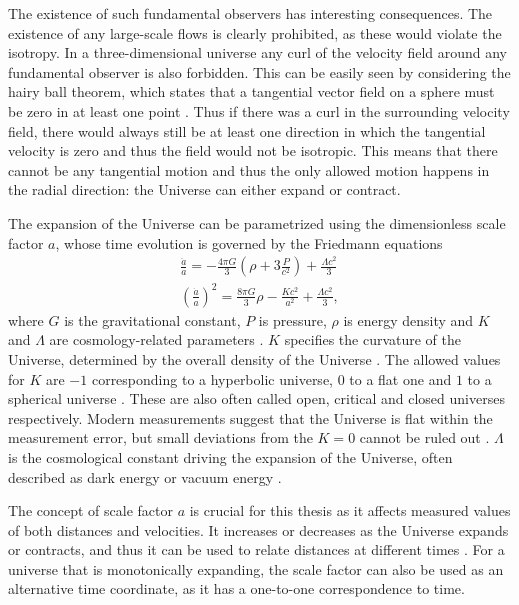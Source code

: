 \documentclass[english, twoside]{HYgradu}
\begin{document}
The existence of such fundamental observers has interesting consequences. The existence of any large-scale flows is clearly prohibited, as these would violate the isotropy. In a three-dimensional universe any curl of the velocity field around any fundamental observer is also forbidden. This can be easily seen by considering the hairy ball theorem, which states that a tangential vector field on a sphere must be zero in at least one point \citep{renteln2013manifolds}. Thus if there was a curl in the surrounding velocity field, there would always still be at least one direction in which the tangential velocity is zero and thus the field would not be isotropic. This means that there cannot be any tangential motion and thus the only allowed motion happens in the radial direction: the Universe can either expand or contract.

The expansion of the Universe can be parametrized using the dimensionless scale factor $a$, whose time evolution is governed by the Friedmann equations
\begin{align}\label{friedmann1}
\frac{\ddot{a}}{a} = -\frac{4\pi G}{3} \left( \rho + 3 \frac{P}{c^2} \right) + \frac{\Lambda c^2}{3} \\ \label{friedmann2}
{\left( \frac{\dot{a}}{a} \right)}^2 = \frac{8\pi G}{3}\rho - \frac{Kc^2}{a^2} + \frac{\Lambda c^2}{3},
\end{align}
where $G$ is the gravitational constant, $P$ is pressure, $\rho$ is energy density and $K$ and $\Lambda$ are cosmology-related parameters \citep{mo2010galaxy}. $K$ specifies the curvature of the Universe, determined by the overall density of the Universe \citep{mo2010galaxy}. The allowed values for $K$ are $-1$ corresponding to a hyperbolic universe, $0$ to a flat one and $1$ to a spherical universe \citep{mo2010galaxy}. These are also often called open, critical and closed universes respectively. Modern measurements suggest that the Universe is flat within the measurement error, but small deviations from the $K=0$ cannot be ruled out \citep{planck2016resultsI}. $\Lambda$ is the cosmological constant driving the expansion of the Universe, often described as dark energy or vacuum energy \citep{mo2010galaxy}.

The concept of scale factor $a$ is crucial for this thesis as it affects measured values of both distances and velocities. It increases or decreases as the Universe expands or contracts, and thus it can be used to relate distances at different times \citep{mo2010galaxy}. For a universe that is monotonically expanding, the scale factor can also be used as an alternative time coordinate, as it has a one-to-one correspondence to time.
\end{document}
